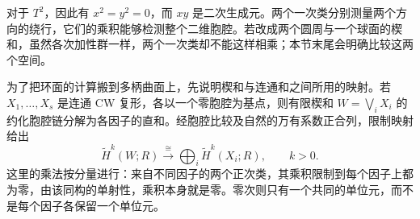 对于 \(T^2\)，因此有 \(x^2=y^2=0\)，而 \(xy\) 是二次生成元。两个一次类分别测量两个方向的绕行，它们的乘积能够检测整个二维胞腔。若改成两个圆周与一个球面的楔和，虽然各次加性群一样，两个一次类却不能这样相乘；本节末尾会明确比较这两个空间。

\ProseParagraphBreak

为了把环面的计算搬到多柄曲面上，先说明楔和与连通和之间所用的映射。若 \(X_1,\ldots,X_s\) 是连通 CW 复形，各以一个零胞腔为基点，则有限楔和 \(W=\bigvee_iX_i\) 的约化胞腔链分解为各因子的直和。经胞腔比较及自然的万有系数正合列，限制映射给出
\begin{equation}\label{g2:eq:wedge-positive-cohomology}
	\widetilde H^k(W;R)\xrightarrow{\ \cong\ }\bigoplus_i\widetilde H^k(X_i;R),\qquad k>0.
\end{equation}
这里的乘法按分量进行：来自不同因子的两个正次类，其乘积限制到每个因子上都为零，由该同构的单射性，乘积本身就是零。零次则只有一个共同的单位元，而不是每个因子各保留一个单位元。

